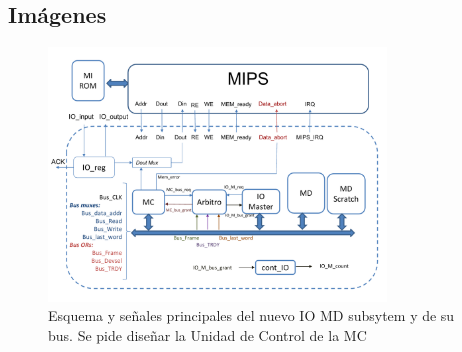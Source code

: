 \documentclass{article}
\begin{document}
\subsection{Imágenes}
\begin{figure}[htbp]
  \centering
  \includegraphics[page=1, width=0.8\textwidth, clip]{assets/AOC2_2024_Esquemas_Proy2.pdf}
  \caption{Esquema y señales principales del nuevo IO MD subsytem y de su bus. Se pide diseñar la
Unidad de Control de la MC}
  \label{fig:imagen}
\end{figure}

\newpage

\end{document}
